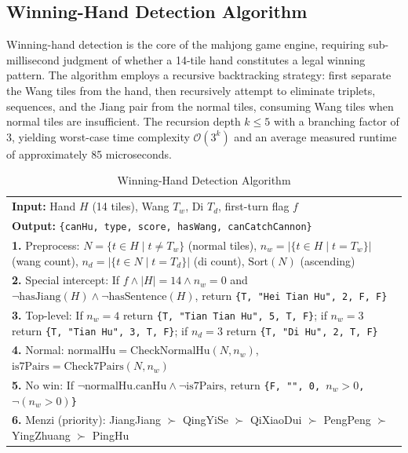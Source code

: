 \documentclass[11pt,a4paper]{article}
\begin{document}
\subsection{Winning-Hand Detection Algorithm}

Winning-hand detection is the core of the mahjong game engine, requiring sub-millisecond judgment of whether a 14-tile hand constitutes a legal winning pattern. The algorithm employs a recursive backtracking strategy: first separate the Wang tiles from the hand, then recursively attempt to eliminate triplets, sequences, and the Jiang pair from the normal tiles, consuming Wang tiles when normal tiles are insufficient. The recursion depth $k\leq 5$ with a branching factor of 3, yielding worst-case time complexity $\mathcal{O}(3^k)$ and an average measured runtime of approximately 85 microseconds.

\begin{table}[H]
\centering
\caption{Winning-Hand Detection Algorithm}
\label{tab:algo_hu}
\small
\begin{tabular}{@{}p{}@{}}
\toprule
\textbf{Input:} Hand $H$ (14 tiles), Wang $T_w$, Di $T_d$, first-turn flag $f$ \\
\textbf{Output:} \texttt{\{canHu, type, score, hasWang, canCatchCannon\}} \\
\midrule
\textbf{1.} Preprocess: $N = \{t \in H \mid t \neq T_w\}$ (normal tiles), $n_w = |\{t \in H \mid t = T_w\}|$ (wang count), $n_d = |\{t \in N \mid t = T_d\}|$ (di count), $\text{Sort}(N)$ (ascending) \\
\textbf{2.} Special intercept: If $f \land |H|=14 \land n_w=0$ and $\neg\text{hasJiang}(H) \land \neg\text{hasSentence}(H)$, return \texttt{\{T, "Hei Tian Hu", 2, F, F\}} \\
\textbf{3.} Top-level: If $n_w=4$ return \texttt{\{T, "Tian Tian Hu", 5, T, F\}}; if $n_w=3$ return \texttt{\{T, "Tian Hu", 3, T, F\}}; if $n_d=3$ return \texttt{\{T, "Di Hu", 2, T, F\}} \\
\textbf{4.} Normal: $\text{normalHu} = \text{CheckNormalHu}(N, n_w)$, $\text{is7Pairs} = \text{Check7Pairs}(N, n_w)$ \\
\textbf{5.} No win: If $\neg\text{normalHu.canHu} \land \neg\text{is7Pairs}$, return \texttt{\{F, "", 0, $n_w>0$, $\neg(n_w>0)$\}} \\
\textbf{6.} Menzi (priority): JiangJiang $\succ$ QingYiSe $\succ$ QiXiaoDui $\succ$ PengPeng $\succ$ YingZhuang $\succ$ PingHu \\
\bottomrule
\end{tabular}
\end{table}
\end{document}
